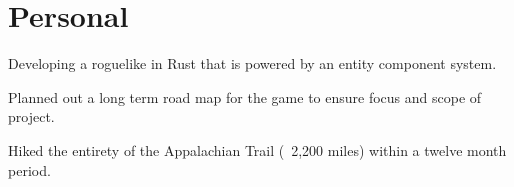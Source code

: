 \documentclass{marvinkassabian_resume}
\begin{document}
	\section{Personal}
			\resumesublistbegin
				\item Developing a roguelike in Rust that is powered by an entity component system.
				\item Planned out a long term road map for the game to ensure focus and scope of project.
			\resumesublistend
			\resumesublistbegin
				\item Hiked the entirety of the Appalachian Trail (~2,200 miles) within a twelve month period.
			\resumesublistend
\end{document}
